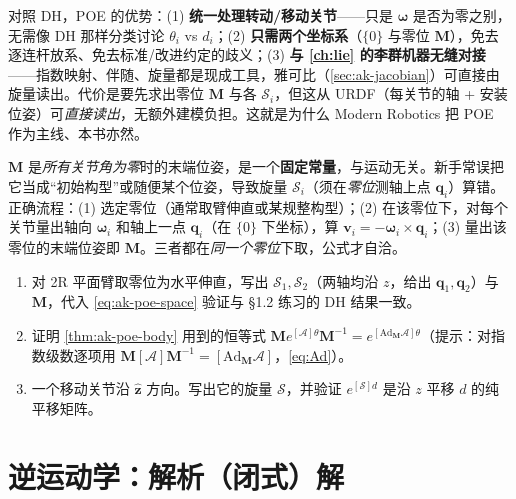 \begin{insight}
对照 DH，POE 的优势\cite{lynch2017modern}：(1) \textbf{统一处理转动/移动关节}——只是 $\boldsymbol{\omega}$ 是否为零之别，无需像 DH 那样分类讨论 $\theta_i$ vs $d_i$；(2) \textbf{只需两个坐标系}（$\{0\}$ 与零位 $\mathbf{M}$），免去逐连杆放系、免去标准/改进约定的歧义；(3) \textbf{与 \cref{ch:lie} 的李群机器无缝对接}——指数映射、伴随、旋量都是现成工具，雅可比（\cref{sec:ak-jacobian}）可直接由旋量读出。代价是要先求出零位 $\mathbf{M}$ 与各 $\mathcal{S}_i$，但这从 URDF（每关节的轴 + 安装位姿）可\emph{直接读出}，无额外建模负担。这就是为什么 Modern Robotics 把 POE 作为主线、本书亦然。
\end{insight}

\begin{pitfall}
$\mathbf{M}$ 是\emph{所有关节角为零}时的末端位姿，是一个\textbf{固定常量}，与运动无关。新手常误把它当成“初始构型”或随便某个位姿，导致旋量 $\mathcal{S}_i$（须在\emph{零位}测轴上点 $\mathbf{q}_i$）算错。正确流程：(1) 选定零位（通常取臂伸直或某规整构型）；(2) 在该零位下，对每个关节量出轴向 $\boldsymbol{\omega}_i$ 和轴上一点 $\mathbf{q}_i$（在 $\{0\}$ 下坐标），算 $\mathbf{v}_i=-\boldsymbol{\omega}_i\times\mathbf{q}_i$；(3) 量出该零位的末端位姿即 $\mathbf{M}$。三者都在\emph{同一个零位}下取，公式才自洽。
\end{pitfall}

\begin{practice}
\begin{enumerate}
  \item 对 2R 平面臂取零位为水平伸直，写出 $\mathcal{S}_1,\mathcal{S}_2$（两轴均沿 $z$，给出 $\mathbf{q}_1,\mathbf{q}_2$）与 $\mathbf{M}$，代入 \cref{eq:ak-poe-space} 验证与 §1.2 练习的 DH 结果一致。
  \item 证明 \cref{thm:ak-poe-body} 用到的恒等式 $\mathbf{M}e^{[\mathcal{A}]\theta}\mathbf{M}^{-1}=e^{[\mathrm{Ad}_{\mathbf{M}}\mathcal{A}]\theta}$（提示：对指数级数逐项用 $\mathbf{M}[\mathcal{A}]\mathbf{M}^{-1}=[\mathrm{Ad}_{\mathbf{M}}\mathcal{A}]$，\cref{eq:Ad}）。
  \item 一个移动关节沿 $\hat{\mathbf{z}}$ 方向。写出它的旋量 $\mathcal{S}$，并验证 $e^{[\mathcal{S}]d}$ 是沿 $z$ 平移 $d$ 的纯平移矩阵。
\end{enumerate}
\end{practice}

\section{逆运动学：解析（闭式）解}
\label{sec:ak-ik-analytic}

